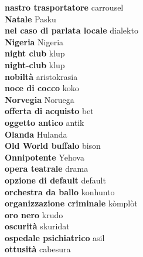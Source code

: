 \textbf{ nastro trasportatore  } carrousel \\
\textbf{ Natale  } Pasku \\
\textbf{ nel caso di parlata locale  } dialekto \\
\textbf{ Nigeria  } Nigeria \\
\textbf{ night club  } klup \\
\textbf{ night-club  } klup \\
\textbf{ nobiltà  } aristokrasia \\
\textbf{ noce di cocco  } koko \\
\textbf{ Norvegia  } Noruega \\
\textbf{ offerta di acquisto  } bet \\
\textbf{ oggetto antico  } antik \\
\textbf{ Olanda  } Hulanda \\
\textbf{ Old World buffalo  } bison \\
\textbf{ Onnipotente  } Yehova \\
\textbf{ opera teatrale  } drama \\
\textbf{ opzione di default  } default \\
\textbf{ orchestra da ballo  } konhunto \\
\textbf{ organizzazione criminale  } kòmplòt \\
\textbf{ oro nero  } krudo \\
\textbf{ oscurità  } skuridat \\
\textbf{ ospedale psichiatrico  } asil \\
\textbf{ ottusità  } cabesura \\

